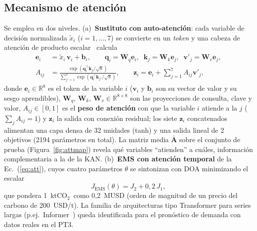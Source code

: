 \documentclass[11pt,a4paper]{article}
\newcommand{\vect}[1]{\bm{#1}}
\newcommand{\CO}{CO$_2$}
\begin{document}
\subsection{Mecanismo de atenci\'on}
Se emplea en dos niveles. (a)~\textbf{Sustituto con auto-atenci\'on}: cada variable de
decisi\'on normalizada $\tilde x_i$ ($i=1,\dots,7$) se convierte en un \emph{token} y una
cabeza de atenci\'on de producto escalar~\cite{vaswani2017} calcula
\begin{align}
\vect{e}_i &= \tilde x_i\,\vect{v}_i + \vect{b}_i,\qquad
\vect{q}_i=\vect{W}_q\vect{e}_i,\;\;\vect{k}_j=\vect{W}_k\vect{e}_j,\;\;\vect{v}'_j=\vect{W}_v\vect{e}_j,
\label{eq:attn}\\
A_{ij} &= \frac{\exp(\vect{q}_i^{\top}\vect{k}_j/\sqrt{8})}{\sum_{j'=1}^{7}\exp(\vect{q}_i^{\top}\vect{k}_{j'}/\sqrt{8})},\qquad
\vect{z}_i=\vect{e}_i+\sum_{j=1}^{7}A_{ij}\vect{v}'_j,
\label{eq:attn2}
\end{align}
donde $\vect{e}_i\in\mathbb{R}^8$ es el token de la variable $i$ ($\vect{v}_i$ y
$\vect{b}_i$ son su vector de valor y su sesgo aprendibles), $\vect{W}_q$, $\vect{W}_k$,
$\vect{W}_v\in\mathbb{R}^{8\times8}$ son las proyecciones de consulta, clave y valor,
$A_{ij}\in[0,1]$ es el \textbf{peso de atenci\'on} con que la variable $i$ atiende a la
$j$ ($\sum_j A_{ij}=1$) y $\vect{z}_i$ la salida con conexi\'on residual; los siete
$\vect{z}_i$ concatenados alimentan una capa densa de 32 unidades (tanh) y una salida
lineal de 2 objetivos (2194 par\'ametros en total). La matriz media $\bar{\vect{A}}$ sobre el
conjunto de prueba (Figura~\ref{fig:attmap}) revela qu\'e variables ``atienden'' a
cu\'ales, informaci\'on complementaria a la de la KAN. (b)~\textbf{EMS con atenci\'on
temporal} de la Ec.~(\ref{eq:att}), cuyos cuatro par\'ametros $\theta$ se sintonizan con
DOA minimizando el escalar
\begin{equation}
J_{\mathrm{EMS}}(\theta) = J_2 + 0{,}2\,J_1,
\label{eq:Jems}
\end{equation}
que pondera 1~kt\CO\ como 0,2~MUSD (orden de magnitud de un precio del carbono de
200~USD/t). La familia de arquitecturas tipo Transformer para series largas (p.ej.\
Informer~\cite{zhou2021informer}) queda identificada para el pron\'ostico de demanda con
datos reales en el PT3.
\end{document}

